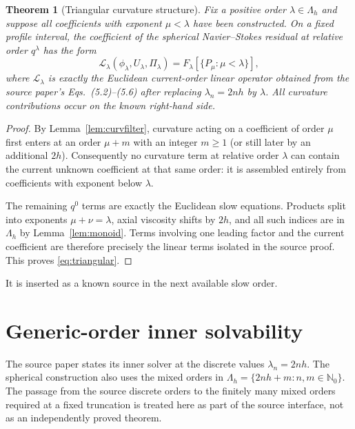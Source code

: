 \documentclass[aps,prd,reprint,superscriptaddress,nofootinbib,floatfix]{revtex4-2}
\newtheorem{theorem}{Theorem}
\theoremstyle{definition}
\theoremstyle{remark}
\newcommand{\cL}{\mathcal{L}}
\newcommand{\Lam}{\Lambda_h}
\begin{document}
\begin{theorem}[Triangular curvature structure]\label{thm:triangular}
	Fix a positive order $\lambda\in\Lam$ and suppose all coefficients with exponent $\mu<\lambda$ have been constructed. On a fixed profile interval, the coefficient of the spherical Navier--Stokes residual at relative order $q^\lambda$ has the form
	\begin{equation}
		\cL_\lambda(\phi_\lambda,U_\lambda,\Pi_\lambda)
		=F_\lambda[\{P_\mu:\mu<\lambda\}],
		\label{eq:triangular}
	\end{equation}
	where $\cL_\lambda$ is exactly the Euclidean current-order linear operator obtained from the source paper's Eqs.~(5.2)--(5.6) after replacing $\lambda_n=2nh$ by $\lambda$. All curvature contributions occur on the known right-hand side.
\end{theorem}

\begin{proof}
	By Lemma~\ref{lem:curvfilter}, curvature acting on a coefficient of order $\mu$ first enters at an order $\mu+m$ with an integer $m\ge1$ (or still later by an additional $2h$). Consequently no curvature term at relative order $\lambda$ can contain the current unknown coefficient at that same order: it is assembled entirely from coefficients with exponent below $\lambda$.

	The remaining $q^0$ terms are exactly the Euclidean slow equations. Products split into exponents $\mu+\nu=\lambda$, axial viscosity shifts by $2h$, and all such indices are in $\Lam$ by Lemma~\ref{lem:monoid}. Terms involving one leading factor and the current coefficient are therefore precisely the linear terms isolated in the source proof. This proves \eqref{eq:triangular}.
\end{proof}

It is inserted as a known source in the next available slow order.


\section{Generic-order inner solvability}\label{sec:innersolve}

The source paper states its inner solver at the discrete values \(\lambda_n=2nh\).  The spherical construction also uses the mixed orders in \(\Lambda_h=\{2nh+m:n,m\in\mathbb N_0\}\).  The passage from the source discrete orders to the finitely many mixed orders required at a fixed truncation is treated here as part of the source interface, not as an independently proved theorem.
\end{document}
